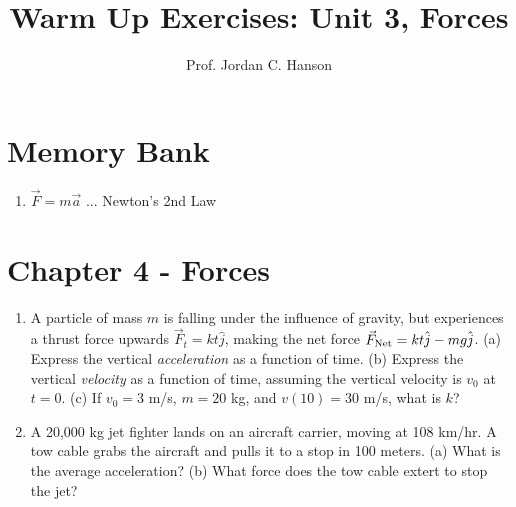 \documentclass{article}
\begin{document}
\title{Warm Up Exercises: Unit 3, Forces}
\author{Prof. Jordan C. Hanson}

\maketitle

\section{Memory Bank}

\begin{enumerate}
\item $\vec{F} = m \vec{a}$ ... Newton's 2nd Law
\end{enumerate}

\section{Chapter 4 - Forces}

\begin{enumerate}
\item A particle of mass $m$ is falling under the influence of gravity, but experiences a thrust force upwards $\vec{F}_t = kt\hat{j}$, making the net force $\vec{F}_{\rm Net} = kt\hat{j}-mg\hat{j}$.  (a) Express the vertical \textit{acceleration} as a function of time.  (b) Express the vertical \textit{velocity} as a function of time, assuming the vertical velocity is $v_0$ at $t=0$. (c) If $v_0 = 3$ m/s, $m = 20$ kg, and $v(10) = 30$ m/s, what is $k$? \\ \vspace{3cm}
\item A 20,000 kg jet fighter lands on an aircraft carrier, moving at 108 km/hr. A tow cable grabs the aircraft and pulls it to a stop in 100 meters. (a) What is the average acceleration? (b) What force does the tow cable extert to stop the jet?
\end{enumerate}
\end{document}
